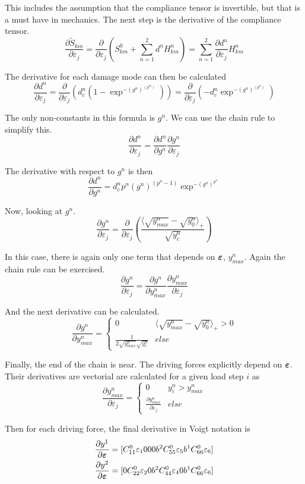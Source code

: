 \documentclass[11pt]{article}
\begin{document}
\begin{enumerate}
This includes the assumption that the compliance tensor is invertible,
but that is a must have in mechanics. The next step is the derivative
of the compliance tensor.
\[
\frac{\partial \tilde{S}_{km}}{\partial \varepsilon_j} =
\frac{\partial}{\partial \varepsilon_j} (S_{km}^{0} + \sum_{n=1}^{2} d^n H^n_{km}) = \sum_{n=1}^2 \frac{\partial d^n}{\partial \varepsilon_j} H_{km}^n
\]

The derivative for each damage mode can then be calculated
\[
\frac{\partial d^n}{\partial \varepsilon_j} =
\frac{\partial}{\partial \varepsilon_j}
(d_c^n(1 - \exp^{-(g^n)^{(p^m)}})) =
\frac{\partial}{\partial \varepsilon_j}(-d_c^n \exp^{-(g^n)^{(p^n)}})
\]

The only non-constants in this formula is \(g^n\). We can use the chain
rule to simplify this.
\[
\frac{\partial d^n}{\partial \varepsilon_j} = 
\frac{\partial d^n}{\partial g^n} \frac{\partial g^n}{\partial \varepsilon_j}
\]

The derivative with respect to \(g^n\) is then
\[
\frac{\partial d^n}{\partial g^n} = d_c^n p^n (g^n)^(p^n - 1) \exp^{-(g^n)^{p^n}}
\]

Now, looking at \(g^n\).
\[
\frac{\partial g^n}{\partial \varepsilon_j} =
\frac{\partial}{\partial \varepsilon_j}
(\frac{\langle \sqrt{y_{max}^n} - \sqrt{y_0^n} \rangle_+}{\sqrt{y_c^n}})
\]

In this case, there is again only one term that depends on \(\bm{\varepsilon}\),
\(y_{max}^n\). Again the chain rule can be exercised.
\[
\frac{\partial g^n}{\partial \varepsilon_j} = 
\frac{\partial g^n}{\partial y_{max}^n} \frac{\partial y_{max}^n}{\partial \varepsilon_j}
\]

And the next derivative can be calculated.
\[
\frac{\partial g^n}{\partial y_{max}^n} =
\begin{cases}
  0 & \langle \sqrt{y_{max}^n} - \sqrt{y_0^n} \rangle_+ > 0 \\
  \frac{1}{2 \sqrt{y_{max}^n} \sqrt{y_c^n}} & else
\end{cases}
\]

Finally, the end of the chain is near. The driving
forces explicitly depend on \(\bm{\varepsilon}\). Their derivatives are vectorial
are calculated for a given load step \(i\) as
\[
\frac{\partial y_{max}^n}{\partial \varepsilon_j} =
\begin{cases}
  0 & y_i^n > y_{max}^n \\
  \frac{\partial y_{max}^n}{\partial \varepsilon_j} & else
\end{cases}
\]

Then for each driving force, the final derivative  in Voigt notation is
\begin{equation}
  \begin{split}
    \frac{\partial y^1}{\partial \bm{\varepsilon}} &=
    [ C_{11}^0 \varepsilon_{1} 0 0 0 b^2 C_{55}^0 \varepsilon_{5} b^1 C_{66}^0 \varepsilon_{6} ] \\
    \frac{\partial y^2}{\partial \bm{\varepsilon}} &=
      [ 0 C_{22}^0 \varepsilon_{2} 0 b^2 C_{44}^0 \varepsilon_{4} 0 b^1 C_{66}^0 \varepsilon_{6} ] 
  \end{split}
\end{equation}


\end{enumerate}
\end{document}
